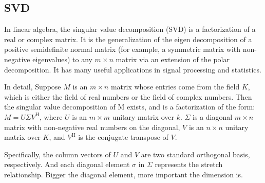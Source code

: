 \documentclass{article}
\begin{document}
        \subsection{SVD}
            \par
            In linear algebra, the singular value decomposition (SVD)
            is a factorization of a real or complex matrix.
            It is the generalization of the eigen decomposition
            of a positive semidefinite normal matrix
            (for example, a symmetric matrix with non-negative eigenvalues)
            to any $m \times n$ matrix via an extension of
            the polar decomposition.
            It has many useful applications in signal processing and statistics.
            \par
            In detail, Suppose $M$ is an $m \times n$ matrix
            whose entries come from the field $K$,
            which is either the field of real numbers
            or the field of complex numbers.
            Then the singular value decomposition of M exists,
            and is a factorization of the form: $M = U \Sigma V^\mathrm{ H }$,
            where $U$ is an $m \times m$ unitary matrix over $k$.
            $\Sigma$ is a diagonal $m \times n$ matrix
            with non-negative real numbers on the diagonal,
            $V$ is an $n \times n$ unitary matrix over $K$,
            and $V^\mathrm{ H }$ is the conjugate transpose of $V$.
            \par
            Specifically, the column vectors of $U$ and $V$
            are two standard orthogonal basis, respectively.
            And each diagonal element $\sigma$ in $\Sigma$
            represents the stretch relationship.
            Bigger the diagonal element,
            more important the dimension is.
\end{document}
